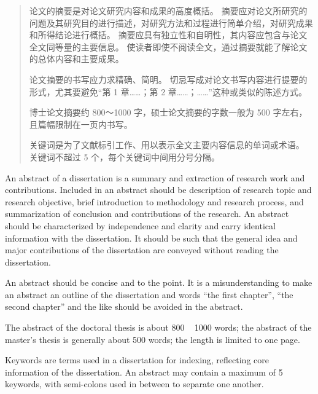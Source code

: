 

\begin{abstract}
  论文的摘要是对论文研究内容和成果的高度概括。
  摘要应对论文所研究的问题及其研究目的进行描述，对研究方法和过程进行简单介绍，对研究成果和所得结论进行概括。
  摘要应具有独立性和自明性，其内容应包含与论文全文同等量的主要信息。
  使读者即使不阅读全文，通过摘要就能了解论文的总体内容和主要成果。

  论文摘要的书写应力求精确、简明。
  切忌写成对论文书写内容进行提要的形式，尤其要避免“第 1 章……；第 2 章……；……”这种或类似的陈述方式。
  
  博士论文摘要约 800～1000 字，硕士论文摘要的字数一般为 500 字左右，且篇幅限制在一页内书写。

  关键词是为了文献标引工作、用以表示全文主要内容信息的单词或术语。
  关键词不超过 5 个，每个关键词中间用分号分隔。

\end{abstract}

\begin{abstract*}
  An abstract of a dissertation is a summary and extraction of research work and contributions.
  Included in an abstract should be description of research topic and research objective, brief introduction to methodology and research process, and summarization of conclusion and contributions of the research.
  An abstract should be characterized by independence and clarity and carry identical information with the dissertation.
  It should be such that the general idea and major contributions of the dissertation are conveyed without reading the dissertation.

  An abstract should be concise and to the point.
  It is a misunderstanding to make an abstract an outline of the dissertation and words “the first chapter”, “the second chapter” and the like should be avoided in the abstract.

  The abstract of the doctoral thesis is about 800 ~ 1000 words; the abstract of the master's thesis is generally about 500 words; the length is limited to one page.

  Keywords are terms used in a dissertation for indexing, reflecting core information of the dissertation.
  An abstract may contain a maximum of 5 keywords, with semi-colons used in between to separate one another.

\end{abstract*}
